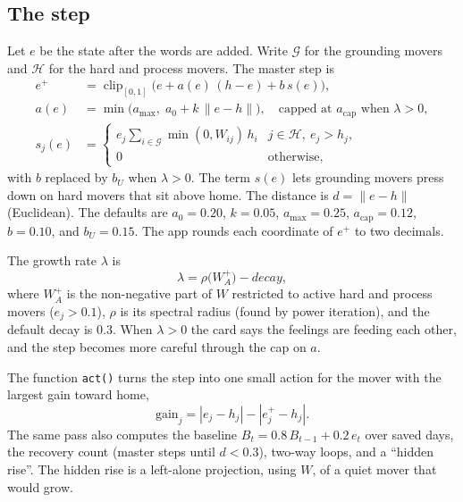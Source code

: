 \documentclass[10pt]{article}
\theoremstyle{definition}
\theoremstyle{remark}
\newcommand{\clip}{\operatorname{clip}_{[0,1]}}
\newcommand{\norm}[1]{\lVert #1\rVert}
\begin{document}
\subsection{The step}
Let $e$ be the state after the words are added. Write $\mathcal{G}$ for the grounding movers and $\mathcal{H}$ for the hard and process movers. The master step is
\begin{align}
e^{+} &= \clip\!\bigl(e + a(e)\,(h-e) + b\,s(e)\bigr), \label{eq:step}\\
a(e) &= \min\bigl(a_{\max},\; a_0 + k\,\norm{e-h}\bigr), \quad\text{capped at } a_{\mathrm{cap}} \text{ when } \lambda>0, \label{eq:a}\\
s_j(e) &= \begin{cases} e_j \displaystyle\sum_{i\in\mathcal{G}} \min(0,W_{ij})\,h_i & j\in\mathcal{H},\ e_j>h_j,\\ 0 & \text{otherwise,}\end{cases} \label{eq:s}
\end{align}
with $b$ replaced by $b_U$ when $\lambda>0$. The term $s(e)$ lets grounding movers press down on hard movers that sit above home. The distance is $d=\norm{e-h}$ (Euclidean). The defaults are $a_0=0.20$, $k=0.05$, $a_{\max}=0.25$, $a_{\mathrm{cap}}=0.12$, $b=0.10$, and $b_U=0.15$. The app rounds each coordinate of $e^{+}$ to two decimals.

The growth rate $\lambda$ is
\begin{equation}
\lambda = \rho\bigl(W_A^{+}\bigr) - \textit{decay},
\end{equation}
where $W_A^{+}$ is the non-negative part of $W$ restricted to active hard and process movers ($e_j>0.1$), $\rho$ is its spectral radius (found by power iteration), and the default decay is $0.3$. When $\lambda>0$ the card says the feelings are feeding each other, and the step becomes more careful through the cap on $a$.

The function \texttt{act()} turns the step into one small action for the mover with the largest gain toward home,
\begin{equation}
\mathrm{gain}_j = |e_j-h_j| - |e^{+}_j-h_j|.
\end{equation}
The same pass also computes the baseline $B_t = 0.8\,B_{t-1} + 0.2\,e_t$ over saved days, the recovery count (master steps until $d<0.3$), two-way loops, and a ``hidden rise''. The hidden rise is a left-alone projection, using $W$, of a quiet mover that would grow.
\end{document}
